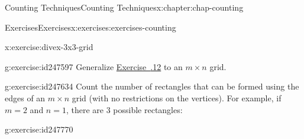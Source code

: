 \documentclass[oneside,10pt,]{book}
\newcommand{\xreffont}{\relax}
\numberwithin{equation}{section}
\begin{document}
\begin{chapterptx}{Counting Techniques}{}{Counting Techniques}{}{}{x:chapter:chap-counting}
\begin{exercises-section}{Exercises}{}{Exercises}{}{}{x:exercises:exercises-counting}
\begin{divisionexercise}{12}{}{}{x:exercise:divex-3x3-grid}
\begin{sidebyside}{3}{0.0916666666666667}{0.0916666666666667}{0.183333333333333}
\begin{sbspanel}{0.15}
%
\end{sbspanel}%
\end{sidebyside}%
\end{divisionexercise}%
\begin{divisionexercise}{13}{}{}{g:exercise:id247597}%
Generalize \hyperlink{x:exercise:divex-3x3-grid}{Exercise~{\xreffont 2.7.12}} to an \(m \times n\) grid.%
\end{divisionexercise}%
\begin{divisionexercise}{14}{}{}{g:exercise:id247634}%
Count the number of rectangles that can be formed using the edges of an \(m \times n\) grid (with no restrictions on the vertices). For example, if \(m = 2\) and \(n = 1\), there are 3 possible rectangles:%
\begin{sidebyside}{3}{0.0916666666666667}{0.0916666666666667}{0.183333333333333}%
\begin{sbspanel}{0.15}%
%
\end{sbspanel}%
\begin{sbspanel}{0.15}%
%
\end{sbspanel}%
\begin{sbspanel}{0.15}%
%
\end{sbspanel}%
\end{sidebyside}%
\end{divisionexercise}%
\begin{divisionexercise}{15}{}{}{g:exercise:id247770}%

\end{divisionexercise}
\end{exercises-section}
\end{chapterptx}
\end{document}
